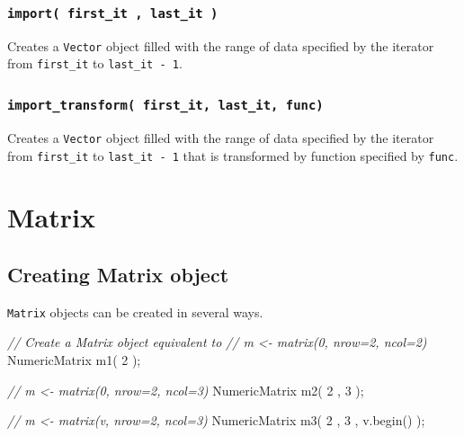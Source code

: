 \documentclass[
]{book}
\newenvironment{Shaded}{\begin{snugshade}}{\end{snugshade}}
\newcommand{\CommentTok}[1]{\textcolor[rgb]{0.56,0.35,0.01}{\textit{#1}}}
\newcommand{\DecValTok}[1]{\textcolor[rgb]{0.00,0.00,0.81}{#1}}
\newcommand{\NormalTok}[1]{#1}
\begin{document}
\hypertarget{import-first_it-last_it}{%
\subsection{\texorpdfstring{\texttt{import(\ first\_it\ ,\ last\_it\ )}}{import( first\_it , last\_it )}}\label{import-first_it-last_it}}

Creates a \texttt{Vector} object filled with the range of data specified by the iterator from \texttt{first\_it} to \texttt{last\_it\ -\ 1}.

\hypertarget{import_transform-first_it-last_it-func}{%
\subsection{\texorpdfstring{\texttt{import\_transform(\ first\_it,\ last\_it,\ func)}}{import\_transform( first\_it, last\_it, func)}}\label{import_transform-first_it-last_it-func}}

Creates a \texttt{Vector} object filled with the range of data specified by the iterator from \texttt{first\_it} to \texttt{last\_it\ -\ 1} that is transformed by function specified by \texttt{func}.

\hypertarget{matrix}{%
\chapter{Matrix}\label{matrix}}

\hypertarget{creating-matrix-object}{%
\section{Creating Matrix object}\label{creating-matrix-object}}

\texttt{Matrix} objects can be created in several ways.

\begin{Shaded}
\begin{Highlighting}[]
\CommentTok{// Create a Matrix object equivalent to}
\CommentTok{// m <- matrix(0, nrow=2, ncol=2)}
\NormalTok{NumericMatrix m1( }\DecValTok{2}\NormalTok{ );}

\CommentTok{// m <- matrix(0, nrow=2, ncol=3)}
\NormalTok{NumericMatrix m2( }\DecValTok{2}\NormalTok{ , }\DecValTok{3}\NormalTok{ );}

\CommentTok{// m <- matrix(v, nrow=2, ncol=3)}
\NormalTok{NumericMatrix m3( }\DecValTok{2}\NormalTok{ , }\DecValTok{3}\NormalTok{ , v.begin() );}
\end{Highlighting}
\end{Shaded}
\end{document}
